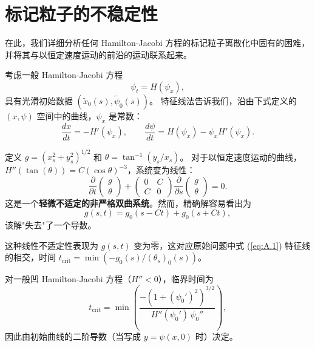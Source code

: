 \documentclass[11pt,a4paper]{article}
\begin{document}
\newpage

\appendix
\section{标记粒子的不稳定性}
\label{app:A}

在此，我们详细分析任何 Hamilton-Jacobi 方程的标记粒子离散化中固有的困难，
并将其与以恒定速度运动的前沿的运动联系起来。

考虑一般 Hamilton-Jacobi 方程
\begin{equation}
\psi_t = H(\psi_x),
\label{eq:A.1}
\end{equation}
具有光滑初始数据 $(\tilde{x}_0(s), \tilde{\psi}_0(s))$。
特征线法告诉我们，沿由下式定义的 $(x, \psi)$ 空间中的曲线，$\psi_x$ 是常数：
\begin{equation}
\frac{dx}{dt} = -H'(\psi_x),\qquad \frac{d\psi}{dt} = H(\psi_x) - \psi_x H'(\psi_x).
\end{equation}

定义 $g = (x_s^2 + y_s^2)^{1/2}$ 和 $\theta = \tan^{-1}(y_s/x_s)$。
对于以恒定速度运动的曲线，$H''(\tan(\theta)) = C(\cos\theta)^{-3}$，系统变为线性：
\begin{equation}
\frac{\partial}{\partial t}\begin{pmatrix} g \\ \theta \end{pmatrix}
+ \begin{pmatrix} 0 & C \\ C & 0 \end{pmatrix}
\frac{\partial}{\partial s}\begin{pmatrix} g \\ \theta \end{pmatrix} = 0.
\label{eq:A.3}
\end{equation}
这是一个\textbf{轻微不适定的非严格双曲系统}。然而，精确解容易看出为
\begin{equation}
g(s,t) = g_0(s - Ct) + g_0(s + Ct),
\end{equation}
该解"失去"了一个导数。

这种线性不适定性表现为 $g(s,t)$ 变为零，这对应原始问题中式 (\ref{eq:A.1}) 
特征线的相交，时间 $t_{\text{crit}} = \min(-g_0(s)/(\theta_s)_0(s))$。

对一般凹 Hamilton-Jacobi 方程（$H'' < 0$），临界时间为
\begin{equation}
t_{\text{crit}} = \min\left(\frac{-(1 + (\psi_0')^2)^{3/2}}{H''(\psi_0')\,\psi_0''}\right),
\end{equation}
因此由初始曲线的二阶导数（当写成 $y = \psi(x,0)$ 时）决定。
\end{document}
